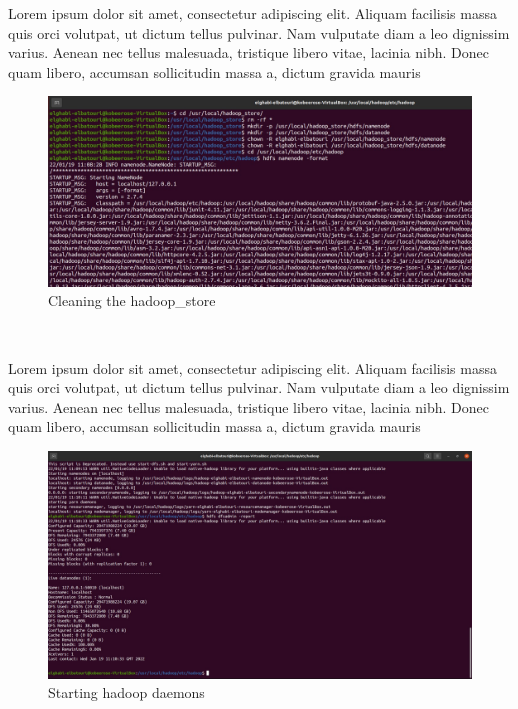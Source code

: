 \begin{spacing}{1.2}
\par Lorem ipsum dolor sit amet, consectetur adipiscing elit. Aliquam facilisis massa quis orci volutpat, ut dictum tellus pulvinar. Nam vulputate diam a leo dignissim varius. Aenean nec tellus malesuada, tristique libero vitae, lacinia nibh. Donec quam libero, accumsan sollicitudin massa a, dictum gravida mauris
\\
\begin{figure}[!htb] 
\begin{center} 
\includegraphics[width=1\linewidth]{Pictures/HBase/Configuring Hbase in Standalone & Pseudo-distributed mode/Installing and Configuring Apache Hbase/Cleaning the hadoop_store} 
\end{center} 
\caption{Cleaning the hadoop_store} 
\end{figure}  \FloatBarrier
\\

\par Lorem ipsum dolor sit amet, consectetur adipiscing elit. Aliquam facilisis massa quis orci volutpat, ut dictum tellus pulvinar. Nam vulputate diam a leo dignissim varius. Aenean nec tellus malesuada, tristique libero vitae, lacinia nibh. Donec quam libero, accumsan sollicitudin massa a, dictum gravida mauris
\\
\begin{figure}[!htb] 
\begin{center} 
\includegraphics[width=1\linewidth]{Pictures/HBase/Configuring Hbase in Standalone & Pseudo-distributed mode/Installing and Configuring Apache Hbase/Starting hadoop daemons} 
\end{center} 
\caption{Starting hadoop daemons} 
\end{figure}  \FloatBarrier
\\

\end{spacing}

